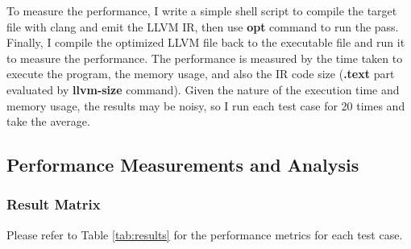 \documentclass[conference]{IEEEtran}
\begin{document}
To measure the performance, I write a simple shell script to compile the target file with clang and emit the LLVM IR, then use \textbf{opt} command to run the pass. Finally, I compile the optimized LLVM file back to the executable file and run it to measure the performance. The performance is measured by the time taken to execute the program, the memory usage, and also the IR code size (\textbf{.text} part evaluated by \textbf{llvm-size} command). Given the nature of the execution time and memory usage, the results may be noisy, so I run each test case for 20 times and take the average.

\subsection{Performance Measurements and Analysis}

\subsubsection{Result Matrix}
Please refer to Table \ref{tab:results} for the performance metrics for each test case.
\end{document}
